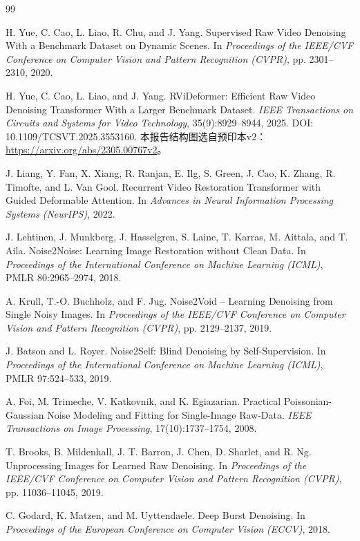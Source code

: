 \documentclass[11pt,a4paper,UTF8,fontset=fandol]{ctexart}
\begin{document}
\begin{thebibliography}{99}

 H. Yue, C. Cao, L. Liao, R. Chu, and J. Yang. Supervised Raw Video Denoising With a Benchmark Dataset on Dynamic Scenes. In \emph{Proceedings of the IEEE/CVF Conference on Computer Vision and Pattern Recognition (CVPR)}, pp. 2301--2310, 2020.

 H. Yue, C. Cao, L. Liao, and J. Yang. RViDeformer: Efficient Raw Video Denoising Transformer With a Larger Benchmark Dataset. \emph{IEEE Transactions on Circuits and Systems for Video Technology}, 35(9):8929--8944, 2025. DOI: 10.1109/TCSVT.2025.3553160. 本报告结构图选自预印本v2：\url{https://arxiv.org/abs/2305.00767v2}。

 J. Liang, Y. Fan, X. Xiang, R. Ranjan, E. Ilg, S. Green, J. Cao, K. Zhang, R. Timofte, and L. Van Gool. Recurrent Video Restoration Transformer with Guided Deformable Attention. In \emph{Advances in Neural Information Processing Systems (NeurIPS)}, 2022.

 J. Lehtinen, J. Munkberg, J. Hasselgren, S. Laine, T. Karras, M. Aittala, and T. Aila. Noise2Noise: Learning Image Restoration without Clean Data. In \emph{Proceedings of the International Conference on Machine Learning (ICML)}, PMLR 80:2965--2974, 2018.

 A. Krull, T.-O. Buchholz, and F. Jug. Noise2Void -- Learning Denoising from Single Noisy Images. In \emph{Proceedings of the IEEE/CVF Conference on Computer Vision and Pattern Recognition (CVPR)}, pp. 2129--2137, 2019.

 J. Batson and L. Royer. Noise2Self: Blind Denoising by Self-Supervision. In \emph{Proceedings of the International Conference on Machine Learning (ICML)}, PMLR 97:524--533, 2019.

 A. Foi, M. Trimeche, V. Katkovnik, and K. Egiazarian. Practical Poissonian-Gaussian Noise Modeling and Fitting for Single-Image Raw-Data. \emph{IEEE Transactions on Image Processing}, 17(10):1737--1754, 2008.

 T. Brooks, B. Mildenhall, J. T. Barron, J. Chen, D. Sharlet, and R. Ng. Unprocessing Images for Learned Raw Denoising. In \emph{Proceedings of the IEEE/CVF Conference on Computer Vision and Pattern Recognition (CVPR)}, pp. 11036--11045, 2019.

 C. Godard, K. Matzen, and M. Uyttendaele. Deep Burst Denoising. In \emph{Proceedings of the European Conference on Computer Vision (ECCV)}, 2018.


\end{thebibliography}
\end{document}
